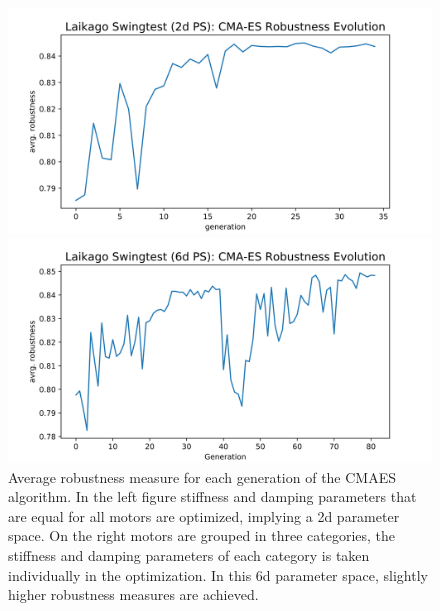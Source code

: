     \begin{figure}[h]
        \centering
        \begin{minipage}{0.5\textwidth}
            \centering
            \includegraphics[width=\textwidth]{figures/swingtest_2dPS_cmaes.png} %
        \end{minipage}\hfill
        \begin{minipage}{0.5\textwidth}
            \centering
            \includegraphics[width=\textwidth]{figures/swingtest_6d_cmaes.png} %
        \end{minipage}
    \caption[CMAES Evolution for 2d and 6d Parameter Spaces]{Average robustness measure for each generation of the CMAES algorithm. In the left figure stiffness and damping parameters that are equal for all motors are optimized, implying a 2d parameter space. On the right motors are grouped in three categories, the stiffness and damping parameters of each category is taken individually in the optimization. In this 6d parameter space, slightly higher robustness measures are achieved.}
    \label{fig:cmaes}
    \end{figure}    

